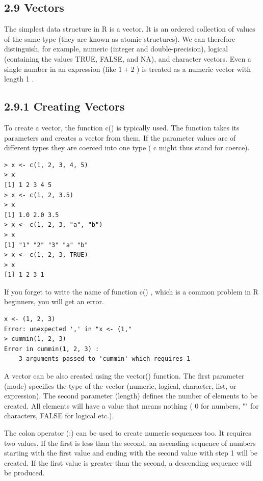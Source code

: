 \documentclass[10pt]{book}
\begin{document}
\subsection*{2.9 Vectors}
The simplest data structure in R is a vector. It is an ordered collection of values of the same type (they are known as atomic structures). We can therefore distinguish, for example, numeric (integer and double-precision), logical (containing the values TRUE, FALSE, and NA), and character vectors. Even a single number in an expression (like $1+2$ ) is treated as a numeric vector with length 1 .

\subsection*{2.9.1 Creating Vectors}
To create a vector, the function c() is typically used. The function takes its parameters and creates a vector from them. If the parameter values are of different types they are coerced into one type ( c might thus stand for coerce).

\begin{verbatim}
> x <- c(1, 2, 3, 4, 5)
> x
[1] 1 2 3 4 5
> x <- c(1, 2, 3.5)
> x
[1] 1.0 2.0 3.5
> x <- c(1, 2, 3, "a", "b")
> x
[1] "1" "2" "3" "a" "b"
> x <- c(1, 2, 3, TRUE)
> x
[1] 1 2 3 1
\end{verbatim}

If you forget to write the name of function c() , which is a common problem in R beginners, you will get an error.

\begin{verbatim}
x <- (1, 2, 3)
Error: unexpected ',' in "x <- (1,"
> cummin(1, 2, 3)
Error in cummin(1, 2, 3) :
    3 arguments passed to 'cummin' which requires 1
\end{verbatim}

A vector can be also created using the vector() function. The first parameter (mode) specifies the type of the vector (numeric, logical, character, list, or expression). The second parameter (length) defines the number of elements to be created. All elements will have a value that means nothing ( 0 for numbers, "" for characters, FALSE for logical etc.).

The colon operator (:) can be used to create numeric sequences too. It requires two values. If the first is less than the second, an ascending sequence of numbers starting with the first value and ending with the second value with step 1 will be created. If the first value is greater than the second, a descending sequence will be produced.
\end{document}
